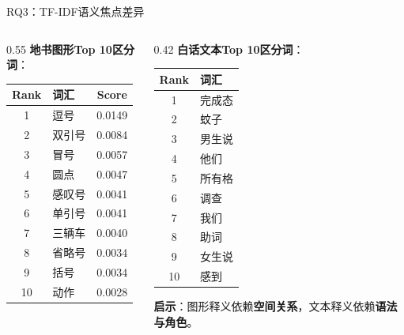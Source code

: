 \documentclass[aspectratio=169,xcolor=x11names,compress]{ctexbeamer}
\begin{document}
\begin{frame}{RQ3：TF-IDF语义焦点差异}
\begin{columns}
\begin{column}{0.55\textwidth}
\footnotesize
\textbf{地书图形Top 10区分词}：
\begin{tabular}{clc}
\toprule
Rank & 词汇 & Score \\
\midrule
1 & 逗号 & 0.0149 \\
2 & 双引号 & 0.0084 \\
3 & 冒号 & 0.0057 \\
4 & 圆点 & 0.0047 \\
5 & 感叹号 & 0.0041 \\
6 & 单引号 & 0.0041 \\
7 & 三辆车 & 0.0040 \\
8 & 省略号 & 0.0034 \\
9 & 括号 & 0.0034 \\
10 & 动作 & 0.0028 \\
\bottomrule
\end{tabular}
\end{column}
\begin{column}{0.42\textwidth}
\footnotesize
\textbf{白话文本Top 10区分词}：
\begin{tabular}{cl}
\toprule
Rank & 词汇 \\
\midrule
1 & 完成态 \\
2 & 蚊子 \\
3 & 男生说 \\
4 & 他们 \\
5 & 所有格 \\
6 & 调查 \\
7 & 我们 \\
8 & 助词 \\
9 & 女生说 \\
10 & 感到 \\
\bottomrule
\end{tabular}

\vspace{0.3em}
\textbf{启示}：图形释义依赖\textbf{空间关系}，文本释义依赖\textbf{语法与角色}。
\end{column}
\end{columns}
\end{frame}
\end{document}
